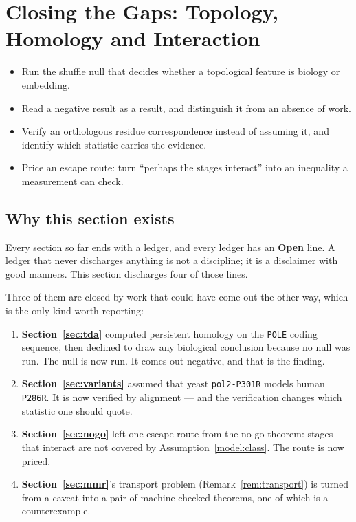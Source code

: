 \section{Closing the Gaps: Topology, Homology and Interaction}\label{sec:gaps}

\begin{objectives}
\begin{itemize}[leftmargin=*,itemsep=1pt,topsep=1pt]
  \item Run the shuffle null that decides whether a topological feature is biology or embedding.
  \item Read a negative result as a result, and distinguish it from an absence of work.
  \item Verify an orthologous residue correspondence instead of assuming it, and identify which statistic carries the evidence.
  \item Price an escape route: turn ``perhaps the stages interact'' into an inequality a measurement can check.
\end{itemize}
\end{objectives}

\subsection{Why this section exists}

Every section so far ends with a ledger, and every ledger has an \textbf{Open}
line. A ledger that never discharges anything is not a discipline; it is a
disclaimer with good manners. This section discharges four of those lines.

Three of them are closed by work that could have come out the other way, which
is the only kind worth reporting:

\begin{enumerate}[leftmargin=*,itemsep=2pt]
  \item \textbf{Section~\ref{sec:tda}} computed persistent homology on the
        \texttt{POLE} coding sequence, then declined to draw any biological
        conclusion because no null was run. The null is now run. It comes out
        negative, and that is the finding.
  \item \textbf{Section~\ref{sec:variants}} assumed that yeast \texttt{pol2-P301R}
        models human \texttt{P286R}. It is now verified by alignment --- and the
        verification changes which statistic one should quote.
  \item \textbf{Section~\ref{sec:nogo}} left one escape route from the no-go
        theorem: stages that interact are not covered by
        Assumption~\ref{model:class}. The route is now priced.
  \item \textbf{Section~\ref{sec:mmr}}'s transport problem
        (Remark~\ref{rem:transport}) is turned from a caveat into a pair of
        machine-checked theorems, one of which is a counterexample.
\end{enumerate}

